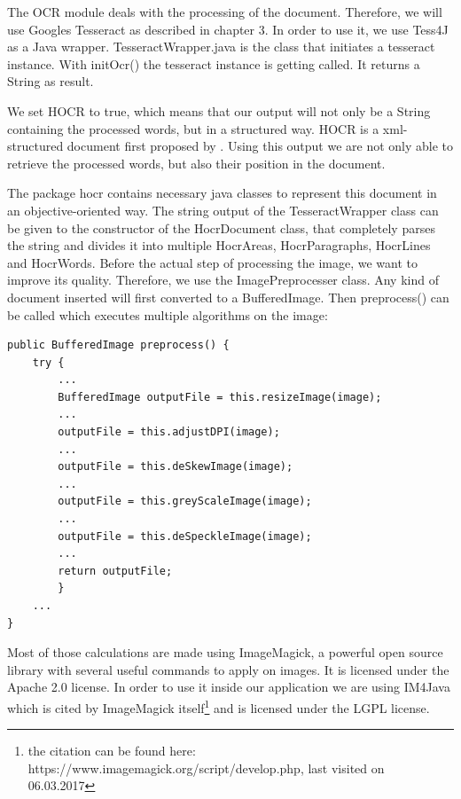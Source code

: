 The OCR module deals with the processing of the document. Therefore, we will use Googles Tesseract as described in chapter 3. In order to use it, we use Tess4J as a Java wrapper. TesseractWrapper.java is the class that initiates a tesseract instance. With initOcr() the tesseract instance is getting called. It returns a String as result. 

We set HOCR to true, which means that our output will not only be a String containing the processed words, but in a structured way. HOCR is a xml-structured document first proposed by \cite{Breuel07}. Using this output we are not only able to retrieve the processed words, but also their position in the document.

The package hocr contains necessary java classes to represent this document in an objective-oriented way. The string output of the TesseractWrapper class can be given to the constructor of the HocrDocument class, that completely parses the string and divides it into multiple HocrAreas, HocrParagraphs, HocrLines and HocrWords.
Before the actual step of processing the image, we want to improve its quality. Therefore, we use the ImagePreprocesser class. Any kind of document inserted will first converted to a BufferedImage. Then preprocess() can be called which executes multiple algorithms on the image:

\begin{lstlisting}[caption={Image preprocessing}]
public BufferedImage preprocess() {
    try {
        ...
        BufferedImage outputFile = this.resizeImage(image);
		...
        outputFile = this.adjustDPI(image);
		...
        outputFile = this.deSkewImage(image);
		...
        outputFile = this.greyScaleImage(image);
		...
        outputFile = this.deSpeckleImage(image);
		...
        return outputFile;
        } 
  	...
}
\end{lstlisting}

Most of those calculations are made using ImageMagick, a powerful open source library with several useful commands to apply on images. It is licensed under the Apache 2.0 license. In order to use it inside our application we are using IM4Java which is cited by ImageMagick itself\footnote{the citation can be found here: https://www.imagemagick.org/script/develop.php, last visited on 06.03.2017} and is licensed under the LGPL license.

